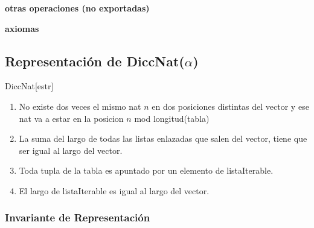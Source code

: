 \begin{tad}{}
	\textbf{otras operaciones (no exportadas)}


	\textbf{axiomas}

\end{tad}

\pagebreak

\subsection{Representación de DiccNat($\alpha$)}

\begin{Estructura}{DiccNat}[estr]
	\begin{Tupla}[estr]
	\end{Tupla}
\end{Estructura}

\begin{enumerate}
	\item No existe dos veces el mismo nat $n$ en dos posiciones distintas del vector y ese nat va a estar en la posicion $n$ mod longitud(tabla)
	\item La suma del largo de todas las listas enlazadas que salen del vector, tiene que ser igual al largo del vector.
	\item Toda tupla de la tabla es apuntado por un elemento de listaIterable.
	\item El largo de listaIterable es igual al largo del vector.
\end{enumerate}

\subsubsection{Invariante de Representación}

\renewcommand{\labelenumi}{(\Roman{enumi})}

